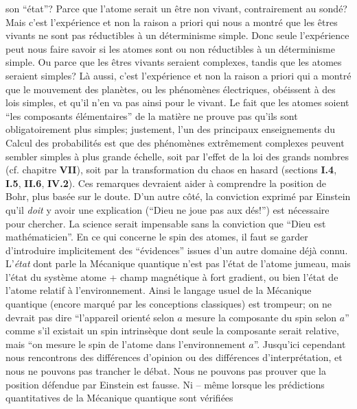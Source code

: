 son ``\'etat''? Parce que l'atome serait un  \^etre non vivant,
contrairement au sond\'e? Mais c'est l'exp\'erience et non  la raison a
priori qui nous a montr\'e que les \^etres vivants ne sont pas r\'eductibles
\`a un d\'eterminisme simple. Donc seule l'exp\'erience peut nous faire
savoir si les atomes sont ou non r\'eductibles \`a un d\'eterminisme
simple. Ou parce que les \^etres vivants seraient complexes, tandis que
les atomes seraient simples?  L\`a aussi, c'est l'exp\'erience et non la
raison a priori qui a montr\'e  que le mouvement des plan\`etes, ou les
ph\'enom\`enes \'electriques, ob\'eissent \`a des lois simples, et qu'il
n'en va pas ainsi pour le vivant. Le fait que les atomes soient ``les
composants \'el\'ementaires'' de la  mati\`ere ne prouve pas qu'ils sont
obligatoirement plus simples; justement, l'un des principaux
enseignements du Calcul des probabilit\'es est que des ph\'enom\`enes
extr\^emement complexes peuvent sembler simples \`a plus grande
\'echelle, soit par l'effet de la loi des grands nombres (cf. chapitre {\bf
VII}), soit par la transformation du chaos en hasard (sections {\bf I.4},
{\bf I.5}, {\bf II.6}, {\bf IV.2}).
\medskip
Ces remarques devraient aider \`a comprendre la position de Bohr, plus
bas\'ee sur le doute. D'un autre c\^ot\'e, la conviction exprim\'e  par
Einstein qu'il {\it doit} y avoir une explication (``Dieu ne joue pas aux
d\'es!'') est  n\'ecessaire pour chercher. La science serait impensable
sans  la conviction que ``Dieu est math\'ematicien''.
\medskip   
En ce qui concerne le spin des atomes, il faut se garder d'introduire
implicitement des  ``\'evidences'' issues d'un autre domaine d\'ej\`a connu.
L'{\it \'etat} dont parle la M\'ecanique quantique n'est pas l'\'etat de 
l'atome jumeau,  mais l'\'etat du syst\`eme atome + champ magn\'etique
\`a fort gradient, ou bien l'\'etat de l'atome relatif \`a l'environnement.
Ainsi le langage usuel de la M\'ecanique quantique (encore marqu\'e  par
les conceptions classiques) est trompeur; on ne devrait pas dire
``l'appareil orient\'e  selon $a$ mesure la composante du spin selon $a$''
comme s'il existait  un spin intrins\`eque  dont seule la composante
serait relative, mais ``on mesure le spin de l'atome dans   
l'environnement $a$''. 
\medskip  
Jusqu'ici cependant nous rencontrons des diff\'erences d'opinion 
ou des dif\-f\'e\-rences d'inter\-pr\'e\-ta\-tion, et nous ne pouvons pas  
trancher le  d\'ebat. Nous ne pouvons pas prouver que la position 
d\'efendue par Einstein est fausse. Ni -- m\^eme lorsque les  
pr\'edictions quantitatives de la M\'ecanique quantique sont v\'erifi\'ees 
